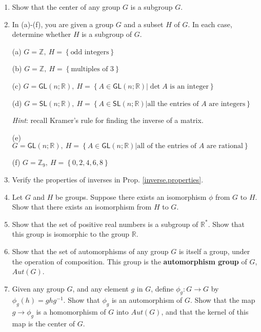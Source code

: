 \documentclass[12pt]{amsbook}
\theoremstyle{plain}
\numberwithin{equation}{chapter}
\numberwithin{theorem}{chapter}
\begin{document}
\begin{enumerate}
\item  Show that the center of any group $G$ is a subgroup $G$.

\item \label{subgroups}In (a)-(f), you are given a group $G$ and a subset $H$
of $G$. In each case, determine whether $H$ is a subgroup of $G$.

(a) $G=\mathbb{Z},\ H=\left\{  \text{odd integers}\right\}  $

(b) $G=\mathbb{Z},\ H=\left\{  \text{multiples of 3}\right\}  $

(c) $G=\mathsf{GL}(n;\mathbb{R}),\ H=\left\{  A\in\mathsf{GL}(n;\mathbb{R}%
)\left|  \det A\text{ is an integer}\right.  \right\}  $

(d) $G=\mathsf{SL}(n;\mathbb{R}),\ H=\left\{  A\in\mathsf{SL}(n;\mathbb{R}%
)\left|  \text{all the entries of }A\text{ are integers}\right.  \right\}  $

\textit{Hint}: recall Kramer's rule for finding the inverse of a matrix.

(e) $G=\mathsf{GL}(n;\mathbb{R}),\ H=\left\{  A\in\mathsf{GL}(n;\mathbb{R}%
)\left|  \text{all of the entries of }A\text{ are rational}\right.  \right\}  $

(f) $G=\mathbb{Z}_{9},\ H=\left\{  0,2,4,6,8\right\}  $

\item \label{inverses}Verify the properties of inverses in Prop.
\ref{inverse.properties}.

\item \label{isomorphisms}Let $G$ and $H$ be groups. Suppose there exists an
isomorphism $\phi$ from $G$ to $H$. Show that there exists an isomorphism from
$H$ to $G$.

\item  Show that the set of positive real numbers is a subgroup of
$\mathbb{R}^{\ast}$. Show that this group is isomorphic to the group
$\mathbb{R}$.

\item  Show that the set of automorphisms of any group $G$ is itself a group,
under the operation of composition. This group is the \textbf{automorphism
group} of $G$, $Aut(G)$.

\item \label{inner}Given any group $G$, and any element $g$ in $G$, define
$\phi_{g}:G\rightarrow G$ by $\phi_{g}(h)=ghg^{-1}$. Show that $\phi_{g}$ is
an automorphism of $G$. Show that the map $g\rightarrow\phi_{g}$ is a
homomorphism of $G$ into $Aut(G)$, and that the kernel of this map is the
center of $G$.


\end{enumerate}
\end{document}
